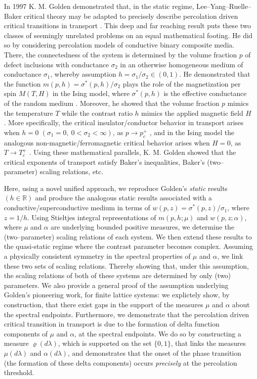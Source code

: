 \documentclass[english,12pt,jmp,graphicx]{revtex4-1}
\begin{document}
  
In 1997 K. M. Golden demonstrated that, in the static regime,
Lee--Yang--Ruelle--Baker critical theory may be adapted to
precisely describe percolation driven critical transitions in transport  
\cite{Golden:PRL-3935}. This deep and far reaching result puts these
two classes of seemingly unrelated problems on an equal mathematical
footing. He did so by considering percolation models of  
conductive binary composite media. There, the connectedness of the
system is determined by the volume fraction $p$ of defect inclusions
with conductance $\sigma_2$ in an otherwise homogeneous medium of
conductance $\sigma_1$, whereby assumption $h=\sigma_1/\sigma_2\in(0,1)$. He
demonstrated that the function $m(p,h)=\sigma^*(p,h)/\sigma_2$ plays the role of
the magnetization per spin $M(T,H)$ in the Ising model, where
$\sigma^*(p,h)$ is the effective conductance of the random medium
\cite{Bergman:PRC-377,Milton:APL-300,Golden:CMP-473}. Moreover, he
showed that 
the volume fraction $p$ mimics the temperature $T$ while the contrast
ratio $h$ mimics the applied magnetic field $H$. More specifically,
the critical insulator/conductor behavior in transport arises when
$h=0$ $(\sigma_1=0, \ 0<\sigma_2<\infty)$, as $p\to p_c^+$ \cite{Golden:PRL-3935}, and
in the Ising model the analogous non-magnetic/ferromagnetic critical
behavior arises when $H=0$, as $T\to T_c^+$
\cite{Christensen-2005}. Using these mathematical parallels,
K. M. Golden showed that the critical exponents of transport satisfy
Baker's inequalities, Baker's (two--parameter) scaling relations, etc.

Here, using a novel unified approach, we reproduce Golden's
\emph{static} results $(h\in\mathbb{R})$ and produce the analogous
static results associated with a conductive/superconductive medium in
terms of $w(p,z)=\sigma^*(p,z)/\sigma_1$, where $z=1/h$. Using Stieltjes integral
representations of $m(p,h;\mu)$ and $w(p,z;\alpha)$, where $\mu$ and $\alpha$ are
underlying bounded positive measures, we determine the (two--parameter)
scaling relations of each system. We then extend these results to the
quasi-static regime where the contrast parameter becomes complex.
Assuming a physically consistent symmetry in the spectral properties
of $\mu$ and $\alpha$, we link these two sets of scaling relations. Thereby
showing that, under this assumption, the scaling relations of both of
these systems are determined by only (two) parameters. We also provide
a general proof of the assumption underlying Golden's pioneering work,
for finite lattice systems: we explictely show, by construction, that
there exist  gaps in the support of the measures $\mu$ and $\alpha$ about the
spectral endpoints. Furthermore, we demonstrate that the percolation
driven critical transition in transport is due to the formation of
delta function components of $\mu$ and $\alpha$, at the spectral
endpoints. We do so by constructing a measure $\varrho(d\lambda)$, which is
supported on the set $\{0,1\}$, that links the measures $\mu(d\lambda)$ and
$\alpha(d\lambda)$, and demonstrates that the onset of the 
phase transition (the formation of these delta components) occurs
\emph{precisely} at the percolation threshold.    
%
%
\end{document}
